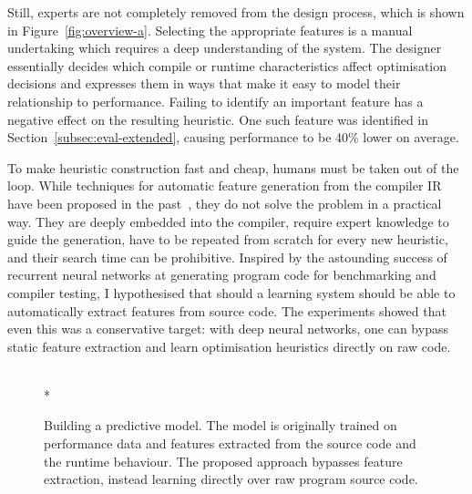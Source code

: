 Still, experts are not completely removed from the design process, which is shown in Figure~\ref{fig:overview-a}. Selecting the appropriate features is a manual undertaking which requires a deep understanding of the system. The designer essentially decides which compile or runtime characteristics affect optimisation decisions and expresses them in ways that make it easy to model their relationship to performance. Failing to identify an important feature has a negative effect on the resulting heuristic. One such feature was identified in Section~\ref{subsec:eval-extended}, causing performance to be 40\% lower on average.

To make heuristic construction fast and cheap, humans must be taken out of the loop. While techniques for automatic feature generation from the compiler IR have been proposed in the past~\cite{Namolaru2010a,Leather2014}, they do not solve the problem in a practical way. They are deeply embedded into the compiler, require expert knowledge to guide the generation, have to be repeated from scratch for every new heuristic, and their search time can be prohibitive. Inspired by the astounding success of recurrent neural networks at generating program code for benchmarking and compiler testing, I hypothesised that should a learning system should be able to automatically extract features from source code. The experiments showed that even this was a conservative target: with deep neural networks, one can bypass static feature extraction and learn optimisation heuristics directly on raw code.

\begin{figure}[t!]
	\centering
	\\*%
	\caption[Using machine learning for compiler optimisations]{%
		Building a predictive model. The model is originally trained on performance data and features extracted from the source code and the runtime behaviour. The proposed approach bypasses feature extraction, instead learning directly over raw program source code.%
	}%
	\label{fig:overview}
\end{figure}

